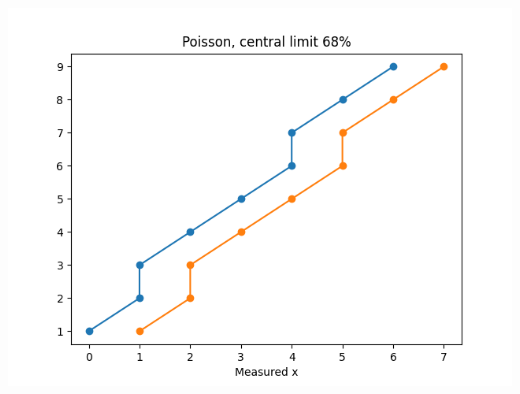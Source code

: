 \documentclass[a4paper,11pt]{article}
\begin{document}
\begin{center}
\includegraphics[width=.9\linewidth]{poisson_central.png}
\end{center}
\end{document}
